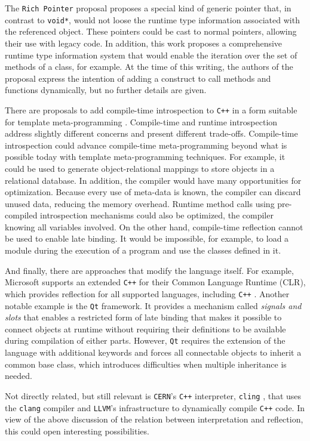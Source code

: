 The \texttt{Rich Pointer} proposal \cite{RichPointers} proposes a special kind of generic pointer that, in contrast to \texttt{void*}, would
not loose the runtime type information associated with the referenced object. These pointers could be cast to normal pointers,
allowing their use with legacy code. In addition, this work proposes a comprehensive runtime type information system that would
enable the iteration over the set of methods of a class, for example. At the time of this writing, the authors of the proposal express
the intention of adding a construct to call methods and functions dynamically, but no further details are given.

There are proposals to add compile-time introspection to \texttt{C++} in a form suitable for template meta-programming \cite{Chochlik}.
Compile-time and runtime introspection address slightly different concerns and present different trade-offs. Compile-time
introspection could advance compile-time meta-programming beyond what is possible today with template meta-programming techniques.
For example, it could be used to generate object-relational mappings to store objects in a relational database.
In addition, the compiler would have many opportunities for optimization. Because every use of meta-data is known, the compiler
can discard unused data, reducing the memory overhead. Runtime method calls using pre-compiled introspection mechanisms could
also be optimized, the compiler knowing all variables involved. On the other hand, compile-time reflection cannot be used to
enable late binding. It would be impossible, for example, to load a module during the execution of a program and
use the classes defined in it.

And finally, there are approaches that modify the language itself. For example, Microsoft supports an extended \texttt{C++} for their
Common Language Runtime (CLR), which provides reflection for all supported languages, including \texttt{C++} \cite{CLR}. Another notable
example is the \texttt{Qt} framework. It provides a mechanism called \emph{signals and slots} that enables a restricted form
of late binding that makes it possible to connect objects at runtime without requiring their definitions to be available during compilation of either parts.
However, \texttt{Qt} requires the extension of the language with additional keywords and forces all connectable objects to inherit a common base class, which introduces
difficulties when multiple inheritance is needed. 

Not directly related, but still relevant is \texttt{CERN}'s \texttt{C++} interpreter, \texttt{cling} \cite{cling}, that uses the \texttt{clang}
\cite{cling} compiler and \texttt{LLVM}'s infrastructure to dynamically compile \texttt{C++} code. In view of the above discussion of the relation between
interpretation and reflection, this could open interesting possibilities.

